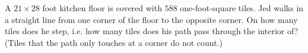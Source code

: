 A $21\times28$ foot kitchen floor is covered with $588$ one-foot-square tiles. Jed walks in a straight line from one corner of the floor to the opposite corner. On how many tiles does he step, i.e. how many tiles does his path pass through the interior of? (Tiles that the path only touches at a corner do not count.)
